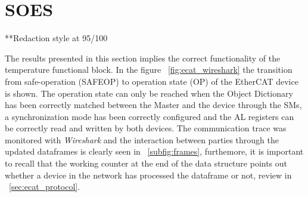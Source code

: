 \section{SOES}
**Redaction style at 95/100

The results presented in this section implies the correct functionality of the temperature functional block.
In the figure ~\ref{fig:ecat_wireshark} the transition from safe-operation (SAFEOP) to operation state (OP) of the EtherCAT device is shown. 
The operation state can only be reached when the Object Dictionary has been correctly matched between the Master and the device
through the SMs, a synchronization mode has been correctly configured and the AL registers can be correctly read and written 
by both devices. The communication trace was monitored with \emph{Wireshark} and the interaction between parties through the updated
dataframes is clearly seen in ~\ref{subfig:frames}, furthemore, it is important to recall that the working counter at the end of the 
data structure points out whether a device in the network has processed the dataframe or not, review in ~\ref{sec:ecat_protocol}.  


